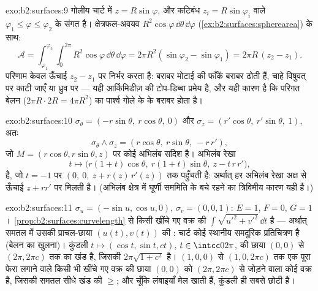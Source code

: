 \begin{solution}{exo:b2:surfaces:9}
गोलीय चार्ट में $z = R\sin\varphi$, और कटिबंध $z_i = R\sin\varphi_i$ वाले $\varphi_1 \leq \varphi \leq \varphi_2$ के संगत है।
क्षेत्रफल-अवयव
$R^2\cos\varphi\,\dd\theta\,\dd\varphi$
(\cref{ex:b2:surfaces:spherearea}) के साथ:
\[
\mathcal A = \int_{\varphi_1}^{\varphi_2}\!\!\int_0^{2\pi}
R^2\cos\varphi\,\dd\theta\,\dd\varphi
= 2\pi R^2(\sin\varphi_2 - \sin\varphi_1)
= 2\pi R\,(z_2 - z_1) .
\]
परिणाम केवल ऊँचाई $z_2 - z_1$ पर निर्भर करता है: बराबर मोटाई की फाँकें
बराबर  ढोती हैं, चाहे विषुवत् पर काटी जाएँ या ध्रुव पर ---
यही आर्किमिडीज़ की टोप-डिब्बा प्रमेय है, और यही कारण है कि परिगत
बेलन ($2\pi R \cdot
2R = 4\pi R^2$) का पार्श्व  गोले के  के बराबर होता है।
\end{solution}

\begin{solution}{exo:b2:surfaces:10}
$\sigma_\theta = (-r\sin\theta,\ r\cos\theta,\ 0)$ और
$\sigma_z = (r'\cos\theta,\ r'\sin\theta,\ 1)$, अतः
\[
\sigma_\theta \wedge \sigma_z
= (r\cos\theta,\ r\sin\theta,\ -r\,r') ,
\]
जो $M = (r\cos\theta, r\sin\theta, z)$ पर कोई अभिलंब सदिश है। अभिलंब रेखा
\[
t \mapsto \bigl(r(1 + t)\cos\theta,\ r(1 + t)\sin\theta,\
z - t\,r\,r'\bigr),
\]
है, जो $t = -1$ पर $(0,\ 0,\ z + r(z)\,r'(z))$ तक पहुँचती है: अर्थात् हर अभिलंब रेखा अक्ष से
ऊँचाई $z + rr'$ पर मिलती है। (अभिलंब क्षेत्र में घूर्णी सममिति के बचे
रहने का त्रिविमीय कारण यही है।)
\end{solution}

\begin{solution}{exo:b2:surfaces:11}
$\sigma_u = (-\sin u, \cos u, 0)$, $\sigma_v = (0, 0, 1)$: $E
= 1$, $F = 0$, $G = 1$। \cref{prop:b2:surfaces:curvelength} से किसी खींचे गए वक्र की 
$\int\sqrt{u'^2 + v'^2}\,\dd t$ है --- अर्थात् समतल में उसकी प्राचल-छाया $(u(t), v(t))$ की : चार्ट
कोई स्थानीय समदूरिक प्रतिचित्रण है (बेलन का खुलना)। कुंडली $t \mapsto (\cos t, \sin t, ct)$,
$t \in \intcc0{2\pi}$, की छाया $(0,0)$ से $(2\pi, 2\pi c)$ तक का खंड है, जिसकी  $2\pi\sqrt{1 + c^2}$ है।
$(1,0,0)$ से $(1,
0, 2\pi c)$ तक एक पूरा फेरा लगाने वाले किसी भी खींचे गए वक्र की
छाया $(0, 0)$ को $(2\pi, 2\pi c)$ से जोड़ने वाला कोई  वक्र है, जिसकी समतल
 सीधे खंड की \omterm{def:b2:curves:length}{लंबाई} $\geq$; और चूँकि लंबाइयाँ मेल खाती हैं,
कुंडली ही सबसे छोटी है।
\end{solution}

